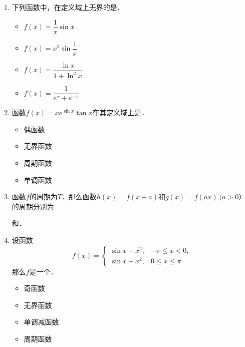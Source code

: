 \documentclass[a4paper,punct=CCT]{ctexbook}
\theoremstyle{definition}
\theoremstyle{remark}
\newif\ifshowsol
\let\leq\leqslant
\let\le\leq
\begin{document}
\begin{enumerate}
\item 下列函数中，在定义域上无界的是\uline{\makebox[4em]{}}．
  \begin{itemize}
    \renewcommand{\labelitemi}{\faCircleThin}
  \item \(f(x) = \dfrac1x \sin x\)
    \ifshowsol
  \item[\faCircle] \(f(x) = x^2 \sin \dfrac1x\)
    \else
  \item \(f(x) = x^2 \sin \dfrac1x\)
    \fi
  \item \(f(x) = \dfrac{\ln x}{1 + \ln^2 x}\)
  \item \(f(x) = \dfrac1{e^x + e^{-x}}\)
  \end{itemize}

\item 函数\(f(x) = x e^{\sin x} \tan x\)在其定义域上是\uline{\makebox[3em]{}}．
  \begin{itemize}
    \renewcommand{\labelitemi}{\faCircleThin}
  \item 偶函数
    \ifshowsol
  \item[\faCircle] 无界函数
    \else
  \item 无界函数
    \fi
  \item 周期函数
  \item 单调函数
  \end{itemize}

\item 函数\(f\)的周期为\(T\)．那么函数\(h(x) = f(x+a)\)和\(g(x) = f(ax)\ (a > 0）\)的周期分别为
  \ifshowsol
  \uline{\makebox[3em]{\(T\)}}和\uline{\makebox[3em]{\(T/a\)}}．
  \else
  \uline{\makebox[3em]{}}和\uline{\makebox[3em]{}}．
  \fi

\item 设函数
  \[
    f(x) =
    \begin{cases}
      \sin x - x^2, & -\pi \le x < 0, \\
      \sin x + x^2, & 0 \le x \le \pi.
    \end{cases}
  \]
  那么\(f\)是一个\uline{\makebox[4em]{}}．
  \begin{itemize}
    \renewcommand{\labelitemi}{\faCircleThin}
    \ifshowsol
  \item[\faCircle] 奇函数
    \else
  \item 奇函数
    \fi
  \item 无界函数
  \item 单调减函数
  \item 周期函数
  \end{itemize}


\end{enumerate}
\end{document}
